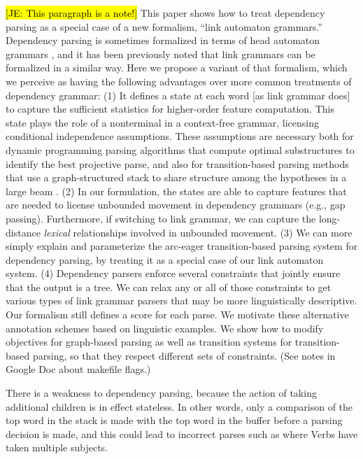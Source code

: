 \documentclass[11pt]{article}
\newcommand{\Note}[1]{}
\renewcommand{\Note}[1]{\hl{[#1]}}  %
\newcommand{\NoteSigned}[3]{{\sethlcolor{#2}\Note{#1: #3}}}
\newcommand{\NoteJE}[1]{\NoteSigned{JE}{LightBlue}{#1}}
\begin{document}
\NoteJE{This paragraph is a note!} This paper shows how to treat
dependency parsing as a special case of a new formalism, ``link
automaton grammars.''  Dependency parsing is sometimes formalized in
terms of head automaton grammars \cite{alshawi,eisner}, and it has
been previously noted \cite{eisner-2000} that link grammars can be
formalized in a similar way.  Here we propose a variant of that
formalism, which we perceive as having the following advantages over
more common treatments of dependency grammar: (1) It defines a state
at each word [as link grammar does] to capture the sufficient
statistics for higher-order feature computation.  This state plays the
role of a nonterminal in a context-free grammar, licensing conditional
independence assumptions.  These assumptions are necessary both for
dynamic programming parsing algorithms that compute optimal
substructures to identify the best projective parse, and also for
transition-based parsing methods that use a graph-structured stack to
share structure among the hypotheses in a large beam \cite{!!!}.  (2)
In our formulation, the states are able to capture features that are
needed to license unbounded movement in dependency grammars (e.g., gap
passing).  Furthermore, if switching to link grammar, we can capture
the long-distance {\em lexical} relationships involved in unbounded
movement.  (3) We can more simply explain and parameterize the
arc-eager transition-based parsing system for dependency parsing, by
treating it as a special case of our link automaton system.  (4)
Dependency parsers enforce several constraints that jointly ensure
that the output is a tree.  We can relax any or all of those
constraints to get various types of link grammar parsers that may be
more linguistically descriptive.  Our formalism still defines a score
for each parse.  We motivate these alternative annotation schemes
based on linguistic examples.  We show how to modify objectives for
graph-based parsing as well as transition systems for transition-based
parsing, so that they respect different sets of constraints.  (See
notes in Google Doc about makefile flags.)

There is a weakness to dependency parsing, because the action of taking additional children is in effect stateless. In other words, only a comparison of the top word in the stack is made with the top word in the buffer before a parsing decision is made, and this could lead to incorrect parses such as where Verbs have taken multiple subjects. 
\end{document}
